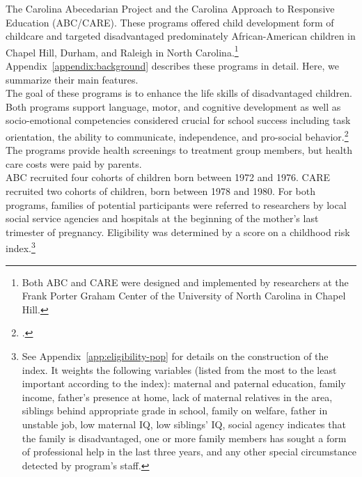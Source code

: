 The Carolina Abecedarian Project and the Carolina Approach to Responsive Education (ABC/CARE). These programs offered child development form of childcare and targeted disadvantaged predominately African-American children in Chapel Hill, Durham, and Raleigh in North Carolina.\footnote{Both ABC and CARE were designed and implemented by researchers at the Frank Porter Graham Center of the University of North Carolina in Chapel Hill.} Appendix~\ref{appendix:background} describes these programs in detail. Here, we summarize their main features.\\

\noindent The goal of these programs is to enhance the life skills of disadvantaged children. Both programs support language, motor, and cognitive development as well as socio-emotional competencies considered crucial for school success including task orientation, the ability to communicate, independence, and pro-social behavior.\footnote{\citet{Sparling_1974_Synth_Edu_Infant_SPEECH, Ramey_Collier_etal_1976_CarolinaAbecedarianProject, Ramey_etal_1985_Project-CARE_TiECSE, Wasik_Ramey_etal_1990_CD, Ramey-etal_2012-ABC}.} The programs provide health screenings to treatment group members, but health care costs were paid by parents.\\

\noindent ABC recruited four cohorts of children born between 1972 and 1976. CARE recruited two cohorts of children, born between 1978 and 1980. For both programs, families of potential participants were referred to researchers by local social service agencies and hospitals at the beginning of the mother's last trimester of pregnancy. Eligibility was determined by a score on a childhood risk index.\footnote{See  Appendix~\ref{app:eligibility-pop} for details on the construction of the index. It weights the following variables (listed from the most to the least important according to the index): maternal and paternal education, family income, father's presence at home, lack of maternal relatives in the area, siblings behind appropriate grade in school, family on welfare, father in unstable job, low maternal IQ, low siblings' IQ, social agency indicates that the family is disadvantaged, one or more family members has sought a form of professional help in the last three years, and any other special circumstance detected by program's staff.}\\

